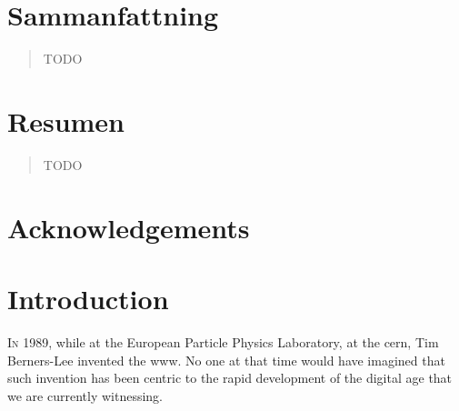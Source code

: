 \documentclass[showtrims, oldfontcommands]{kthesis}
\makeatletter
\renewcommand\tableofcontents{%
        \chapter{\contentsname
        \@mkboth{%
           \MakeUppercase\contentsname}{\MakeUppercase\contentsname}}%
        \@starttoc{toc}%
        }
\makeatother
\begin{document}
\cleardoublepage
{}
\chapter*{Sammanfattning}
\renewcommand{\abstractname}{\vspace{-\baselineskip}}
\begin{abstract}
    TODO
\end{abstract}
\clearpage

\cleardoublepage
{}
\chapter*{Resumen}
\renewcommand{\abstractname}{\vspace{-\baselineskip}}
\begin{abstract}
    TODO
\end{abstract}
\clearpage


\cleardoublepage
{}
{}
\chapter*{Acknowledgements}
\pagestyle{headings}

\clearpage

\clearforchapter
\tableofcontents
\cleardoublepage

\mainmatter

\chapter{Introduction}
    \label{chapter:introduction}

    
\lettrine{\textcolor[gray]{.25}{I}}{n} 1989, while at the European Particle Physics 
Laboratory, at the \acf{cern}, Tim Berners-Lee invented the \Ac{www}. No one at that 
time would have imagined that such invention has been centric to the rapid development 
of the digital age that we are currently witnessing.
\end{document}
